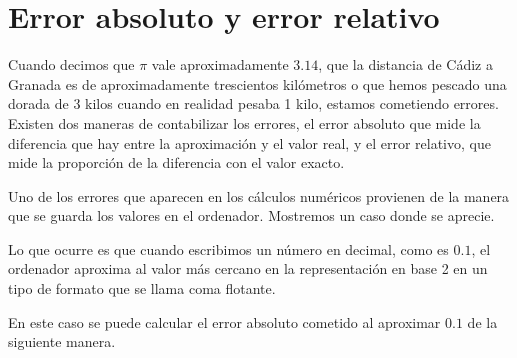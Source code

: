 
\section{Error absoluto y error relativo}

Cuando decimos que $\pi$ vale aproximadamente $3.14$,
que la distancia de Cádiz a Granada es de aproximadamente
trescientos kilómetros o que hemos pescado una dorada de
3 kilos cuando en realidad pesaba 1 kilo,
estamos cometiendo errores.
Existen dos maneras de contabilizar los errores, el
error absoluto que mide la diferencia que hay entre
la aproximación y el valor real,
y el error relativo, que mide la proporción de la diferencia
con el valor exacto.

Uno de los errores que aparecen en los cálculos numéricos
provienen de la manera que se guarda los valores en el ordenador.
Mostremos un caso donde se aprecie.



Lo que ocurre es que cuando escribimos un número en decimal,
como es $0.1$, el ordenador aproxima al valor más cercano
en la representación en base 2 en un tipo de formato que
se llama coma flotante.

En este caso se puede calcular el error absoluto cometido
al aproximar $0.1$ de la siguiente manera.



